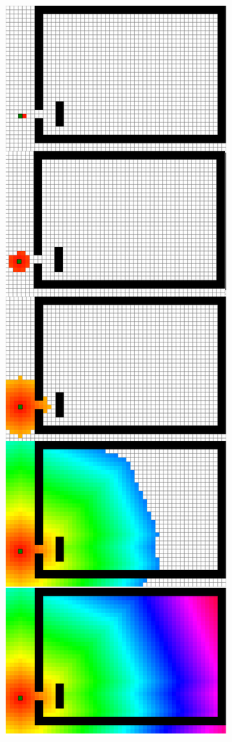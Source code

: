 \begin{figure}
\begin{minipage}{0.32\textwidth}
\end{minipage}%
\begin{minipage}{0.32\textwidth}
\centering
  \includegraphics[width=\linewidth]{abbildungen/vergleich_euklid_fast_marching/snapshot_eDijkstra_zusammen_cutted.png}

\end{minipage}
\end{figure}
